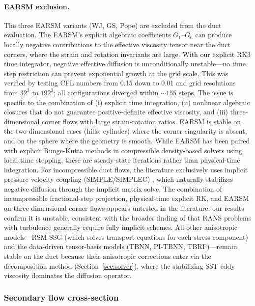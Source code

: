 \paragraph{EARSM exclusion.}
The three EARSM variants (WJ, GS, Pope) are excluded from the duct evaluation.
The EARSM's explicit algebraic coefficients $G_1$--$G_6$ \citep{GatskiSpeziale1993, WallinJohansson2000} can produce locally negative contributions to the effective viscosity tensor near the duct corners, where the strain and rotation invariants are large.
With our explicit RK3 time integrator, negative effective diffusion is unconditionally unstable---no time step restriction can prevent exponential growth at the grid scale.
This was verified by testing CFL numbers from 0.15 down to 0.01 and grid resolutions from $32^3$ to $192^3$; all configurations diverged within ${\sim}155$ steps.
The issue is specific to the combination of (i) explicit time integration, (ii) nonlinear algebraic closures that do not guarantee positive-definite effective viscosity, and (iii) three-dimensional corner flows with large strain-rotation ratios.
EARSM is stable on the two-dimensional cases (hills, cylinder) where the corner singularity is absent, and on the sphere where the geometry is smooth.
While EARSM has been paired with explicit Runge-Kutta methods in compressible density-based solvers \citep{Bassi2015,Furst2019} using local time stepping, these are steady-state iterations rather than physical-time integration.
For incompressible duct flows, the literature exclusively uses implicit pressure-velocity coupling (SIMPLE/SIMPLEC) \citep{WallinJohansson2000, Hellsten2005, Baungaard2022}, which naturally stabilizes negative diffusion through the implicit matrix solve.
The combination of incompressible fractional-step projection, physical-time explicit RK, and EARSM on three-dimensional corner flows appears untested in the literature; our results confirm it is unstable, consistent with the broader finding of \citet{CarpenterKennedy2005} that RANS problems with turbulence generally require fully implicit schemes.
All other anisotropic models---RSM-SSG (which solves transport equations for each stress component) and the data-driven tensor-basis models (TBNN, PI-TBNN, TBRF)---remain stable on the duct because their anisotropic corrections enter via the decomposition method (Section~\ref{sec:solver}), where the stabilizing SST eddy viscosity dominates the diffusion operator.

\subsubsection{Secondary flow cross-section}

